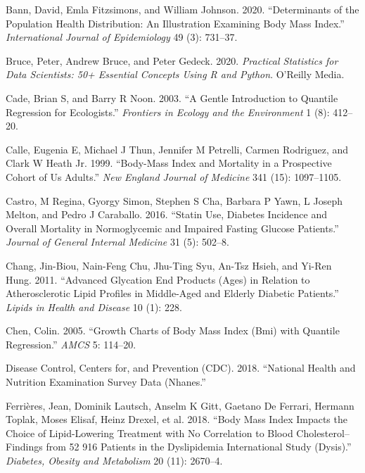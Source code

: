 \documentclass[
  12pt,
]{article}
\begin{document}
\leavevmode\hypertarget{ref-bann2020}{}%
Bann, David, Emla Fitzsimons, and William Johnson. 2020. ``Determinants of the Population Health Distribution: An Illustration Examining Body Mass Index.'' \emph{International Journal of Epidemiology} 49 (3): 731--37.

\leavevmode\hypertarget{ref-bruce2020}{}%
Bruce, Peter, Andrew Bruce, and Peter Gedeck. 2020. \emph{Practical Statistics for Data Scientists: 50+ Essential Concepts Using R and Python}. O'Reilly Media.

\leavevmode\hypertarget{ref-cade2003}{}%
Cade, Brian S, and Barry R Noon. 2003. ``A Gentle Introduction to Quantile Regression for Ecologists.'' \emph{Frontiers in Ecology and the Environment} 1 (8): 412--20.

\leavevmode\hypertarget{ref-calle1999body}{}%
Calle, Eugenia E, Michael J Thun, Jennifer M Petrelli, Carmen Rodriguez, and Clark W Heath Jr. 1999. ``Body-Mass Index and Mortality in a Prospective Cohort of Us Adults.'' \emph{New England Journal of Medicine} 341 (15): 1097--1105.

\leavevmode\hypertarget{ref-castro2016}{}%
Castro, M Regina, Gyorgy Simon, Stephen S Cha, Barbara P Yawn, L Joseph Melton, and Pedro J Caraballo. 2016. ``Statin Use, Diabetes Incidence and Overall Mortality in Normoglycemic and Impaired Fasting Glucose Patients.'' \emph{Journal of General Internal Medicine} 31 (5): 502--8.

\leavevmode\hypertarget{ref-chang2011}{}%
Chang, Jin-Biou, Nain-Feng Chu, Jhu-Ting Syu, An-Tsz Hsieh, and Yi-Ren Hung. 2011. ``Advanced Glycation End Products (Ages) in Relation to Atherosclerotic Lipid Profiles in Middle-Aged and Elderly Diabetic Patients.'' \emph{Lipids in Health and Disease} 10 (1): 228.

\leavevmode\hypertarget{ref-chen2005}{}%
Chen, Colin. 2005. ``Growth Charts of Body Mass Index (Bmi) with Quantile Regression.'' \emph{AMCS} 5: 114--20.

\leavevmode\hypertarget{ref-NHANES}{}%
Disease Control, Centers for, and Prevention (CDC). 2018. ``National Health and Nutrition Examination Survey Data (Nhanes.''

\leavevmode\hypertarget{ref-ferrieres2018}{}%
Ferrières, Jean, Dominik Lautsch, Anselm K Gitt, Gaetano De Ferrari, Hermann Toplak, Moses Elisaf, Heinz Drexel, et al. 2018. ``Body Mass Index Impacts the Choice of Lipid-Lowering Treatment with No Correlation to Blood Cholesterol--Findings from 52 916 Patients in the Dyslipidemia International Study (Dysis).'' \emph{Diabetes, Obesity and Metabolism} 20 (11): 2670--4.
\end{document}
